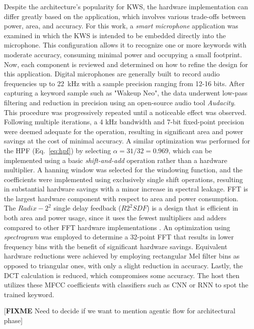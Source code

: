 Despite the architecture's popularity for KWS, the hardware implementation can differ greatly based on the application, which involves various trade-offs between power, area, and accuracy.
For this work, a \textit{smart microphone } application was examined in which the KWS is intended to be embedded directly into the microphone. This configuration allows it to recognize one or more keywords with moderate accuracy, consuming minimal power and occupying a small footprint.
Now, each component is reviewed and determined on how to refine the design for this application. Digital microphones are generally built to record audio frequencies up to 22~kHz with a sample precision ranging from 12-16 bits. After capturing a keyword sample such as "Wakeup Neo", the data underwent low-pass filtering and reduction in precision using an open-source audio tool \textit{Audacity}. This procedure was progressively repeated until a noticeable effect was observed. Following multiple iterations, a 4 kHz bandwidth and 7-bit fixed-point precision were deemed adequate for the operation, resulting in significant area and power savings at the cost of minimal accuracy.
A similar optimization was performed for the HPF (Eq.~\ref{eq:hpf}) by selecting $\alpha=31/32=0.969$, which can be implemented using a basic \textit{shift-and-add} operation rather than a hardware multiplier. 
A hanning window was selected for the windowing function, and the coefficients were implemented using exclusively single shift operations, resulting in substantial hardware savings with a minor increase in spectral leakage. 
FFT is the largest hardware component with respect to area and power consumption. The $Radix-2^2$ single delay feedback ($R2^2SDF$) is a design that is efficient in both area and power usage, since it uses the fewest multipliers and adders compared to other FFT hardware implementations \cite{chong20220}. An optimization using \textit{spectrogram} was employed to determine a 32-point FFT that results in lower frequency bins with the benefit of significant hardware savings.
Equivalent hardware reductions were achieved by employing rectangular Mel filter bins as opposed to triangular ones, with only a slight reduction in accuracy. 
Lastly, the DCT calculation is reduced, which compromises some accuracy. The host then utilizes these MFCC coefficients with classifiers such as CNN or RNN to spot the trained keyword.

[\textbf{FIXME} Need to decide if we want to mention agentic flow for architectural phase]

